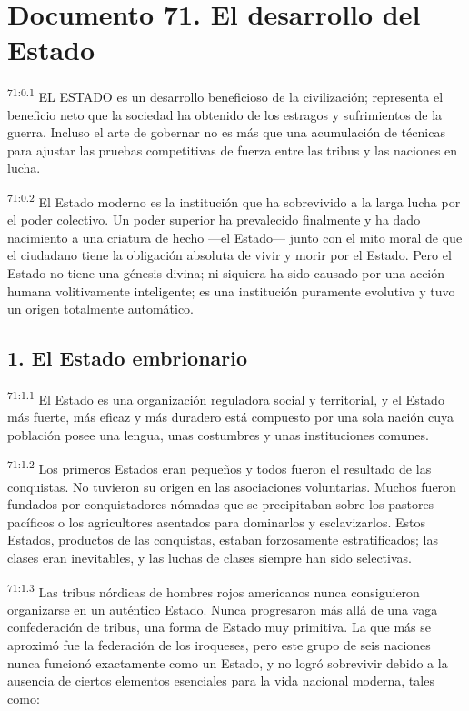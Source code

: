 \chapter{Documento 71. El desarrollo del Estado}
\par
\textsuperscript{71:0.1} EL ESTADO es un desarrollo beneficioso de la civilización; representa el beneficio neto que la sociedad ha obtenido de los estragos y sufrimientos de la guerra. Incluso el arte de gobernar no es más que una acumulación de técnicas para ajustar las pruebas competitivas de fuerza entre las tribus y las naciones en lucha.

\par
\textsuperscript{71:0.2} El Estado moderno es la institución que ha sobrevivido a la larga lucha por el poder colectivo. Un poder superior ha prevalecido finalmente y ha dado nacimiento a una criatura de hecho ---el Estado--- junto con el mito moral de que el ciudadano tiene la obligación absoluta de vivir y morir por el Estado. Pero el Estado no tiene una génesis divina; ni siquiera ha sido causado por una acción humana volitivamente inteligente; es una institución puramente evolutiva y tuvo un origen totalmente automático.

\section*{1. El Estado embrionario}
\par
\textsuperscript{71:1.1} El Estado es una organización reguladora social y territorial, y el Estado más fuerte, más eficaz y más duradero está compuesto por una sola nación cuya población posee una lengua, unas costumbres y unas instituciones comunes.

\par
\textsuperscript{71:1.2} Los primeros Estados eran pequeños y todos fueron el resultado de las conquistas. No tuvieron su origen en las asociaciones voluntarias. Muchos fueron fundados por conquistadores nómadas que se precipitaban sobre los pastores pacíficos o los agricultores asentados para dominarlos y esclavizarlos. Estos Estados, productos de las conquistas, estaban forzosamente estratificados; las clases eran inevitables, y las luchas de clases siempre han sido selectivas.

\par
\textsuperscript{71:1.3} Las tribus nórdicas de hombres rojos americanos nunca consiguieron organizarse en un auténtico Estado. Nunca progresaron más allá de una vaga confederación de tribus, una forma de Estado muy primitiva. La que más se aproximó fue la federación de los iroqueses, pero este grupo de seis naciones nunca funcionó exactamente como un Estado, y no logró sobrevivir debido a la ausencia de ciertos elementos esenciales para la vida nacional moderna, tales como:

